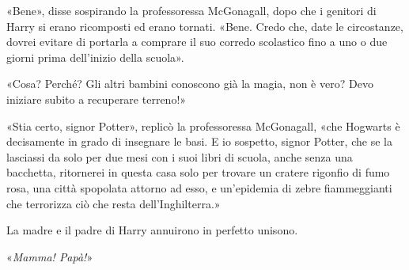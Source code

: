 «Bene», disse sospirando la professoressa McGonagall, dopo che i genitori di Harry si erano ricomposti ed erano tornati. «Bene. Credo che, date le circostanze, dovrei evitare di portarla a comprare il suo corredo scolastico fino a uno o due giorni prima dell’inizio della scuola».

«Cosa? Perché? Gli altri bambini conoscono già la magia, non è vero? Devo iniziare subito a recuperare terreno!»

«Stia certo, signor Potter», replicò la professoressa McGonagall, «che Hogwarts è decisamente in grado di insegnare le basi. E io sospetto, signor Potter, che se la lasciassi da solo per due mesi con i suoi libri di scuola, anche senza una bacchetta, ritornerei in questa casa solo per trovare un cratere rigonfio di fumo rosa, una città spopolata attorno ad esso, e un’epidemia di zebre fiammeggianti che terrorizza ciò che resta dell’Inghilterra.»

La madre e il padre di Harry annuirono in perfetto unisono.

«\textit{Mamma! Papà!}»
